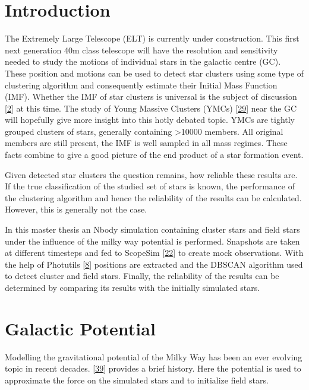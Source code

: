 \documentclass[letterpaper,10pt,english]{sphinxmanual}
\begin{document}
\chapter{Introduction}
\label{\detokenize{NBodySimulation/Introduction:introduction}}\label{\detokenize{NBodySimulation/Introduction::doc}}
\sphinxAtStartPar
The Extremely Large Telescope (ELT) is currently under construction.
This first next generation 40m class telescope will have the resolution and sensitivity needed to study the motions of individual stars in the galactic centre (GC).
These position and motions can be used to detect star clusters using some type of clustering algorithm and consequently estimate their Initial Mass Function (IMF).
Whether the IMF of star clusters is universal is the subject of discussion {[}\hyperlink{cite.NBodySimulation/Appendix:id45}{2}{]} at this time.
The study of Young Massive Clusters (YMCs) {[}\hyperlink{cite.NBodySimulation/Appendix:id56}{29}{]} near the GC will hopefully give more insight into this hotly debated topic.
YMCs are tightly grouped clusters of stars, generally containing \textgreater{}10000 members.
All original members are still present, the IMF is well sampled in all mass regimes. These facts combine to give a good picture of the end product of a star formation event.

\sphinxAtStartPar
Given detected star clusters the question remains, how reliable these results are.
If the true classification of the studied set of stars is known, the performance of the clustering algorithm and hence the reliability of the results can be calculated.
However, this is generally not the case.

\sphinxAtStartPar
In this master thesis an N\sphinxhyphen{}body simulation containing cluster stars and field stars under the influence of the milky way potential is performed.
Snapshots are taken at different timesteps and fed to ScopeSim {[}\hyperlink{cite.NBodySimulation/Appendix:id50}{22}{]} to create mock observations.
With the help of Photutils {[}\hyperlink{cite.NBodySimulation/Appendix:id54}{8}{]} positions are extracted and the DBSCAN algorithm used to detect cluster and field stars.
Finally, the reliability of the results can be determined by comparing its results with the initially simulated stars.


\chapter{Galactic Potential}
\label{\detokenize{NBodySimulation/Potential:galactic-potential}}\label{\detokenize{NBodySimulation/Potential:galactic-potential-label}}\label{\detokenize{NBodySimulation/Potential::doc}}
\sphinxAtStartPar
Modelling the gravitational potential of the Milky Way has been an ever evolving topic in recent decades. {[}\hyperlink{cite.NBodySimulation/Appendix:id58}{39}{]} provides a brief history.
Here the potential is used to approximate the force on the simulated stars and to initialize field stars.
\end{document}
